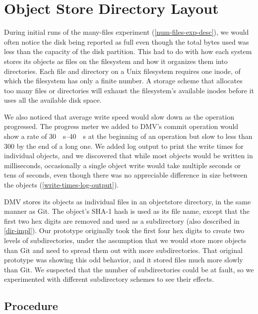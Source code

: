 \section{Object Store Directory Layout}
\label{dir-experiment}

During initial runs of the many-files experiment
(\autoref{num-files-exp-desc}), we would often notice the disk being reported as
full even though the total bytes used was less than the capacity of the disk
partition. This had to do with how each system stores its objects as files on
the filesystem and how it organizes them into directories. Each file and
directory on a Unix filesystem requires one \gls{inode}, of which the filesystem
has only a finite number. A storage scheme that allocates too many files or
directories will exhaust the filesystem's available \glspl{inode} before it uses
all the available disk space.

We also noticed that average write speed would slow down as the operation
progressed. The progress meter we added to \gls{DMV}'s \gls{commit} operation
would show a rate of \SIrange{30}{40}{\mib\s} at the beginning of an operation
but slow to less than \SI{300}{\kib} by the end of a long one. We added log
output to print the write times for individual objects, and we discovered that
while most objects would be written in milliseconds, occasionally a single
object write would take multiple seconds or tens of seconds, even though there
was no appreciable difference in size between the objects
(\autoref{write-times-log-output}).

\gls{DMV} stores its objects as individual files in an \gls{objectstore}
directory, in the same manner as Git. The object's SHA-1 hash is used as its
file name, except that the first two hex digits are removed and used as a
subdirectory (also described in \autoref{dir-impl}). Our prototype originally
took the first four hex digits to create two levels of subdirectories, under the
assumption that we would store more objects than Git and need to spread them out
with more subdirectories. That original prototype was showing this odd behavior,
and it stored files much more slowly than Git. We suspected that the number of
subdirectories could be at fault, so we experimented with different subdirectory
schemes to see their effects.

%


\subsection{Procedure}

